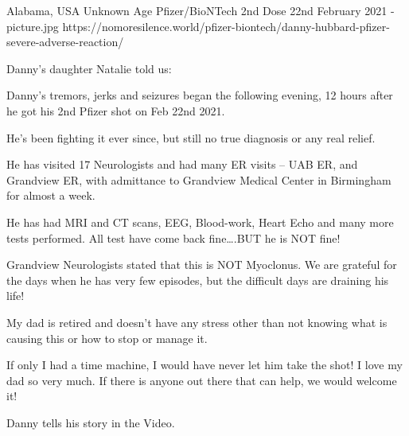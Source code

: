 {Alabama, USA}
{Unknown Age}
{Pfizer/BioNTech}
{2nd Dose 22nd February 2021}
{-}
{picture.jpg}
{https://nomoresilence.world/pfizer-biontech/danny-hubbard-pfizer-severe-adverse-reaction/}
{


Danny’s daughter Natalie told us:

Danny’s tremors, jerks and seizures began the following evening, 12 hours after he got his 2nd Pfizer shot on Feb 22nd 2021.

He’s been fighting it ever since, but still no true diagnosis or any real relief.

He has visited 17 Neurologists and had many ER visits – UAB ER, and Grandview ER, with admittance to Grandview Medical Center in Birmingham for almost a week.

He has had MRI and CT scans, EEG, Blood-work, Heart Echo and many more tests performed. All test have come back fine….BUT he is NOT fine!

Grandview Neurologists stated that this is NOT Myoclonus. We are grateful for the days when he has very few episodes, but the difficult days are draining his life!

My dad is retired and doesn’t have any stress other than not knowing what is causing this or how to stop or manage it.

If only I had a time machine, I would have never let him take the shot! I love my dad so very much. If there is anyone out there that can help, we would welcome it!

Danny tells his story in the Video.
}
